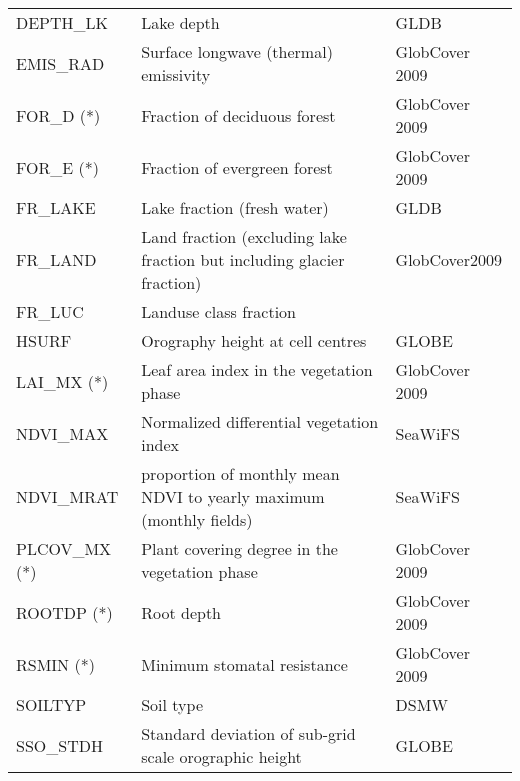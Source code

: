 \begin{longtable}{p{2.5cm}p{8.5cm}p{3.3cm}}
  DEPTH\_LK                             & Lake depth                                      &        GLDB               \\
  EMIS\_RAD                             & Surface longwave (thermal) emissivity           &        GlobCover 2009     \\               
  FOR\_D  (*)                           & Fraction of deciduous forest                    &        GlobCover 2009     \\
  FOR\_E  (*)                           & Fraction of evergreen forest                    &        GlobCover 2009     \\
  FR\_LAKE                              & Lake fraction (fresh water)                     &        GLDB               \\                     
  FR\_LAND                              & Land fraction (excluding lake fraction but including glacier fraction) & GlobCover2009   \\
  FR\_LUC                               & Landuse class fraction                          &                           \\
  HSURF                                 & Orography height at cell centres                &        GLOBE              \\
  LAI\_MX  (*)                          & Leaf area index in the vegetation phase         &        GlobCover 2009     \\
  NDVI\_MAX                             & Normalized differential vegetation index        &        SeaWiFS            \\
  NDVI\_MRAT                            & proportion of monthly mean NDVI to yearly maximum (monthly fields)&  SeaWiFS \\
  PLCOV\_MX  (*)                        & Plant covering degree in the vegetation phase   &        GlobCover 2009     \\
  ROOTDP (*)                            & Root depth                                      &        GlobCover 2009     \\
  RSMIN  (*)                            & Minimum stomatal resistance                     &        GlobCover 2009     \\
  SOILTYP                               & Soil type                                       &        DSMW               \\
  SSO\_STDH                             & Standard deviation of sub-grid scale orographic height  &   GLOBE           \\

\end{longtable}
